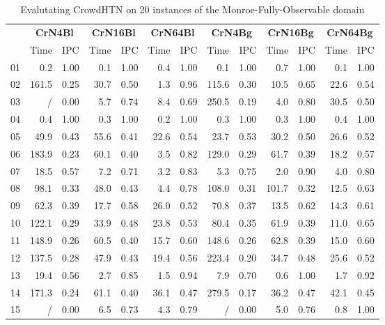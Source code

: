 \begin{table}[!hbp]
	\caption{Evalutating CrowdHTN on 20 instances of the Monroe-Fully-Observable domain}
	\label{table: eval scalability}
	\centering
	\begin{tabular}{|l|rc|rc|rc|rc|rc|rc|}
		\hline
		& \multicolumn{2}{c|}{\textbf{CrN4Bl}} & \multicolumn{2}{c|}{\textbf{CrN16Bl}} & \multicolumn{2}{c|}{\textbf{CrN64Bl}} & \multicolumn{2}{c|}{\textbf{CrN4Bg}} & \multicolumn{2}{c|}{\textbf{CrN16Bg}} & \multicolumn{2}{c|}{\textbf{CrN64Bg}}\\
		& Time & IPC & Time & IPC & Time & IPC & Time & IPC & Time & IPC & Time & IPC\\
		\hline
		01 & 0.2 & 1.00 & 0.1 & 1.00 & 0.4 & 1.00 & 0.1 & 1.00 & 0.7 & 1.00 & 0.1 & 1.00\\
		02 & 161.5 & 0.25 & 30.7 & 0.50 & 1.3 & 0.96 & 115.6 & 0.30 & 10.5 & 0.65 & 22.6 & 0.54\\
		03 & / & 0.00 & 5.7 & 0.74 & 8.4 & 0.69 & 250.5 & 0.19 & 4.0 & 0.80 & 30.5 & 0.50\\
		04 & 0.4 & 1.00 & 0.3 & 1.00 & 0.2 & 1.00 & 0.3 & 1.00 & 0.3 & 1.00 & 0.4 & 1.00\\
		05 & 49.9 & 0.43 & 55.6 & 0.41 & 22.6 & 0.54 & 23.7 & 0.53 & 30.2 & 0.50 & 26.6 & 0.52\\
		06 & 183.9 & 0.23 & 60.1 & 0.40 & 3.5 & 0.82 & 129.0 & 0.29 & 61.7 & 0.39 & 18.2 & 0.57\\
		07 & 18.5 & 0.57 & 7.2 & 0.71 & 3.2 & 0.83 & 5.3 & 0.75 & 2.0 & 0.90 & 4.0 & 0.80\\
		08 & 98.1 & 0.33 & 48.0 & 0.43 & 4.4 & 0.78 & 108.0 & 0.31 & 101.7 & 0.32 & 12.5 & 0.63\\
		09 & 62.3 & 0.39 & 17.7 & 0.58 & 26.0 & 0.52 & 70.8 & 0.37 & 13.5 & 0.62 & 14.3 & 0.61\\
		10 & 122.1 & 0.29 & 33.9 & 0.48 & 23.8 & 0.53 & 80.4 & 0.35 & 61.9 & 0.39 & 11.0 & 0.65\\
		11 & 148.9 & 0.26 & 60.5 & 0.40 & 15.7 & 0.60 & 148.6 & 0.26 & 62.8 & 0.39 & 15.0 & 0.60\\
		12 & 137.5 & 0.28 & 47.9 & 0.43 & 19.4 & 0.56 & 223.4 & 0.20 & 34.7 & 0.48 & 25.6 & 0.52\\
		13 & 19.4 & 0.56 & 2.7 & 0.85 & 1.5 & 0.94 & 7.9 & 0.70 & 0.6 & 1.00 & 1.7 & 0.92\\
		14 & 171.3 & 0.24 & 61.1 & 0.40 & 36.1 & 0.47 & 279.5 & 0.17 & 36.2 & 0.47 & 42.1 & 0.45\\
		15 & / & 0.00 & 6.5 & 0.73 & 4.3 & 0.79 & / & 0.00 & 5.0 & 0.76 & 0.8 & 1.00\\

\end{tabular}
\end{table}
